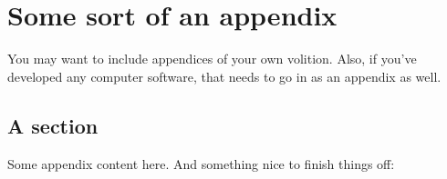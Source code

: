 
\chapter{Some sort of an appendix}
\label{appendix:somesort}

You may want to include appendices of your own volition. Also, if you've developed any computer software, that needs to go in as an appendix as well.

\section{A section}

Some appendix content here. And something nice to finish things off:


